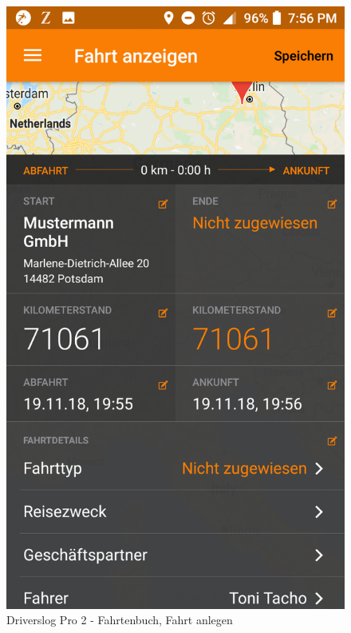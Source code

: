 \begin{figure}[H]
\begin{minipage}[b]{.4\linewidth}
        \includegraphics[scale=0.12]{img/pro4}
        \caption{\label{img:img/pro4}Driverslog Pro 2 - Fahrtenbuch, Fahrt anlegen}
    \end{minipage}
\end{figure}


